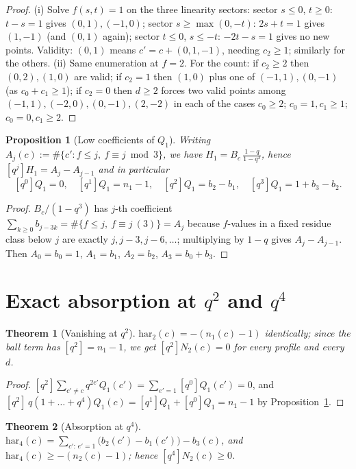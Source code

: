 \documentclass[11pt]{article}
\newtheorem{theorem}{Theorem}
\newtheorem{proposition}{Proposition}
\begin{document}
\begin{proof}
(i) Solve $f(s,t)=1$ on the three linearity sectors: sector $s\leq 0$,
$t\geq0$: $t-s=1$ gives $(0,1),(-1,0)$; sector $s\geq\max(0,-t)$:
$2s+t=1$ gives $(1,-1)$ (and $(0,1)$ again); sector $t\leq0$, $s\leq-t$:
$-2t-s=1$ gives no new points. Validity: $(0,1)$ means
$c'=c+(0,1,-1)$, needing $c_2\geq1$; similarly for the others.
(ii) Same enumeration at $f=2$. For the count: if $c_2\geq2$ then
$(0,2),(1,0)$ are valid; if $c_2=1$ then $(1,0)$ plus one of
$(-1,1),(0,-1)$ (as $c_0+c_1 \geq 1$); if $c_2=0$ then $d\geq2$ forces
two valid points among $(-1,1),(-2,0),(0,-1),(2,-2)$ in each of the cases
$c_0\geq2$; $c_0=1,c_1\geq1$; $c_0=0,c_1\geq2$.
\end{proof}

\begin{proposition}[Low coefficients of $Q_1$]\label{prop:lowQ1}
Writing $A_j(c) := \#\{c' : f \leq j,\ f\equiv j \bmod 3\}$, we have
$H_1 = B_c\,\frac{1-q}{1-q^3}$, hence $[q^j]H_1 = A_j - A_{j-1}$ and in
particular
\[
[q^0]Q_1 = 0,\quad [q^1]Q_1 = n_1 - 1,\quad [q^2]Q_1 = b_2 - b_1,\quad
[q^3]Q_1 = 1 + b_3 - b_2 .
\]
\end{proposition}

\begin{proof}
$B_c/(1-q^3)$ has $j$-th coefficient $\sum_{k\geq0} b_{j-3k} =
\#\{f\leq j,\ f\equiv j\ (3)\} = A_j$ because $f$-values in a fixed
residue class below $j$ are exactly $j, j-3, j-6,\dots$; multiplying by
$1-q$ gives $A_j - A_{j-1}$. Then $A_0=b_0=1$, $A_1=b_1$, $A_2=b_2$,
$A_3 = b_0+b_3$.
\end{proof}

\section{Exact absorption at $q^2$ and $q^4$}

\begin{theorem}[Vanishing at $q^2$]\label{thm:q2}
$\mathrm{har}_2(c) = -(n_1(c)-1)$ identically; since the ball term has
$[q^2] = n_1 - 1$, we get $[q^2]N_2(c) = 0$ for every profile and every
$d$.
\end{theorem}

\begin{proof}
$[q^2]\sum_{c'\neq c} q^{2e'}Q_1(c') = \sum_{e'=1}[q^0]Q_1(c') = 0$, and
$[q^2]\,q(1+\dots+q^4)Q_1(c) = [q^1]Q_1 + [q^0]Q_1 = n_1-1$ by
Proposition~\ref{prop:lowQ1}.
\end{proof}

\begin{theorem}[Absorption at $q^4$]\label{thm:q4}
$\mathrm{har}_4(c) = \sum_{c':\,e'=1}\bigl(b_2(c') - b_1(c')\bigr) - b_3(c)$,
and $\mathrm{har}_4(c) \geq -(n_2(c)-1)$; hence $[q^4]N_2(c) \geq 0$.
\end{theorem}
\end{document}
